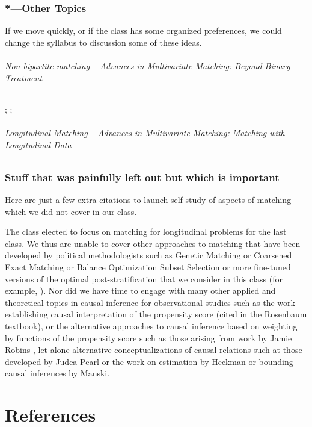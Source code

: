 \documentclass[10pt, letterpaper]{article}
\begin{document}
\cite{imbens2003sea}


\section{*---Other Topics}

If we move quickly, or if the class has some organized preferences, we could
change the syllabus to discussion some of these ideas.


\paragraph{Non-bipartite matching -- Advances in Multivariate Matching: Beyond Binary Treatment }
\citealp[Chap 11]{rosenbaum2010design}; \cite{lu2011optimal}; \cite{imaivandyk:04}

\paragraph{Longitudinal Matching -- Advances in Multivariate Matching: Matching with Longitudinal Data}
\citealp[Chap 12]{rosenbaum2010design}


\section{Stuff that was painfully left out but which is important}

Here are just a few extra citations to launch self-study of aspects of
matching which we did not cover in our class.

The class elected to focus on matching for longitudinal problems for
the last class. We thus are unable to cover other approaches to
matching that have been developed by political methodologists such as
Genetic Matching \citep{diamond2013genetic, sekhon2007multivariate} or
Coarsened Exact Matching \citep{iacus2009causal,
  iacus2011multivariate} or Balance Optimization Subset Selection
\citep{Nikolaevetal:12} or more fine-tuned versions of the optimal
post-stratification that we consider in this class (for example,
\citep{zubizarreta2012using}). Nor did we have time to engage with
many other applied and theoretical topics in causal inference for
observational studies such as the work establishing causal
interpretation of the propensity score (cited in the Rosenbaum
textbook), or the alternative approaches to causal inference based on
weighting by functions of the propensity score such as those arising
from work by Jamie Robins \citep{glynn2010introduction}, let alone
alternative conceptualizations of causal relations such at those
developed by Judea Pearl \citep{JudeaPearl2000a} or the work on
estimation by Heckman or bounding causal inferences by Manski.


\part{References}


\end{document}
